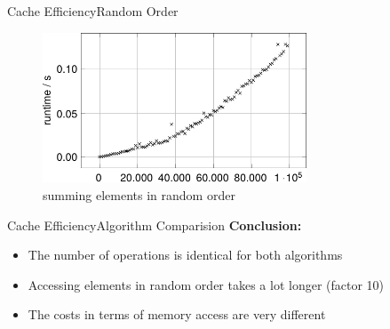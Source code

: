 %
%  
%
%
%  


\begin{frame}{Cache Efficiency}{Random Order}
  \begin{figure}
    \begin{center}
      \includegraphics[width=0.7\textwidth]{Images/Caching/sumrandom-plot.pdf}
    \end{center}
    \caption{summing elements in random order}
    \label{fig:caching:sum_random_order}
  \end{figure}
\end{frame}


\begin{frame}{Cache Efficiency}{Algorithm Comparision}
  \textbf{Conclusion:}
  \begin{itemize}
    \item<2->
      The number of operations is identical for both algorithms
    \item<3->
      Accessing elements in random order takes a lot longer (factor 10)
    \item<3->
      The costs in terms of memory access are very different
  \end{itemize}
\end{frame}

